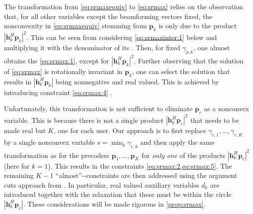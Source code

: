 \documentclass[a4paper,10pt,journal]{IEEEtran}
\let\vec\bm
\begin{document}
The transformation from \cref{eq:srmaxequiv} to \cref{eq:srmax} relies on the observation that, for all other variables except the beamforming vectors fixed, the nonconvexity in \cref{eq:srmaxequiv} stemming from $\vec p_k$ is only due to the product $|\vec h_k^H \vec p_k|^2$. This can be seen from considering \cref{eq:srmaxinter:1} below and multiplying it with the denominator of its . Then, for fixed $\gamma_{p,k}$, one almost obtains the  \cref{eq:srmax:1}, except for $|\vec h_k^H \vec p_k|^2$. Further observing that the solution of \cref{eq:srmax} is rotationally invariant in $\vec p_k$, one can select the solution that results in $|\vec h_k^H \vec p_k|$ being nonnegative and real valued. This is achieved by introducing constraint \cref{eq:srmax:4} \cite{Bengtsson1999}.

Unfortunately, this transformation is not sufficient to eliminate $\vec p_c$ as a nonconvex variable. This is because there is not a single product $|\vec h_k^H \vec p_c|^2$ that needs to be made real but $K$, one for each user. Our approach is to first replace $\gamma_{c,1}, \dots, \gamma_{c,K}$ by a single nonconvex variable $s = \min_k \gamma_{c,k}$ and then apply the same transformation as for the precoders $\vec p_1, \dots, \vec p_K$ for \emph{only one} of the products $|\vec h_k^H \vec p_c|^2$ (here for $k = 1$). This results in the constraints \cref{eq:srmax:2,eq:srmax:5}. The remaining $K-1$ ``almost''--constraints are then addressed using the argument cuts approach from \cite{Lu2017}. In particular, real valued auxiliary variables $d_k$ are introduced together with the relaxation that these must be within the circle $|\vec h_k^H \vec p_c|$. These considerations will be made rigorous in \cref{prop:srmax}.
\end{document}

